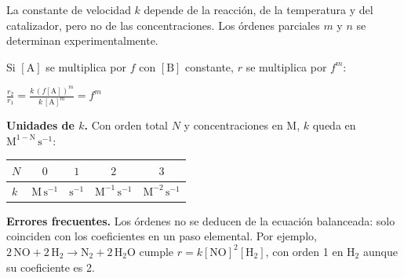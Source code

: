 \documentclass[10pt,letterpaper]{article}
\newcommand{\A}{[\mathrm{A}]}
\newcommand{\B}{[\mathrm{B}]}
\begin{document}
\vspace{2pt}
\begin{minipage}[t]{0.47\linewidth}\vspace{0pt}
La constante de velocidad $k$ depende de la reacción, de la temperatura y del catalizador, pero no de las
concentraciones. Los órdenes parciales $m$ y $n$ se determinan experimentalmente.\par\vspace{6pt}
Si $\A$ se multiplica por $f$ con $\B$ constante, $r$ se multiplica por $f^{m}$:
\begin{apoyo}
$\displaystyle \frac{r_2}{r_1}=\frac{k\,(f\A)^{m}}{k\,\A^{m}}=f^{m}$
\end{apoyo}
\end{minipage}\hfill
\begin{minipage}[t]{0.49\linewidth}\vspace{0pt}

\vspace{8pt}
\small\textbf{Unidades de $k$.} Con orden total $N$ y concentraciones en M, $k$ queda en $\mathrm{M^{1-N}\,s^{-1}}$:\\[6pt]
\begin{tabular}{@{}lcccc@{}}
\toprule
$N$ & $0$ & $1$ & $2$ & $3$\\
\midrule
$k$ & $\mathrm{M\,s^{-1}}$ & $\mathrm{s^{-1}}$ & $\mathrm{M^{-1}\,s^{-1}}$ & $\mathrm{M^{-2}\,s^{-1}}$\\
\bottomrule
\end{tabular}
\end{minipage}

\begin{alerta}
\textbf{Errores frecuentes.} Los órdenes no se deducen de la ecuación balanceada: solo coinciden con los coeficientes en un
paso elemental. Por ejemplo, $2\,\mathrm{NO}+2\,\mathrm{H_2}\to\mathrm{N_2}+2\,\mathrm{H_2O}$ cumple
$r=k[\mathrm{NO}]^{2}[\mathrm{H_2}]$, con orden 1 en $\mathrm{H_2}$ aunque su coeficiente es 2.
\end{alerta}
\end{document}
